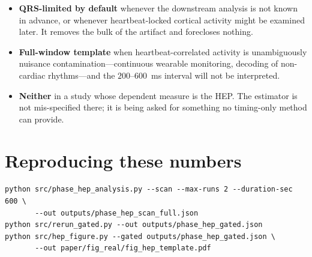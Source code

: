 \documentclass[11pt]{article}
\begin{document}
\begin{itemize}[leftmargin=1.4em,itemsep=0.2em]
\item \textbf{QRS-limited by default} whenever the downstream analysis is not known in advance, or
whenever heartbeat-locked cortical activity might be examined later. It removes the bulk of the
artifact and forecloses nothing.
\item \textbf{Full-window template} when heartbeat-correlated activity is unambiguously nuisance
contamination---continuous wearable monitoring, decoding of non-cardiac rhythms---and the
$200$--$600$~ms interval will not be interpreted.
\item \textbf{Neither} in a study whose dependent measure is the HEP. The estimator is not
mis-specified there; it is being asked for something no timing-only method can provide.
\end{itemize}

\section*{Reproducing these numbers}

\begin{verbatim}
python src/phase_hep_analysis.py --scan --max-runs 2 --duration-sec 600 \
       --out outputs/phase_hep_scan_full.json
python src/rerun_gated.py --out outputs/phase_hep_gated.json
python src/hep_figure.py --gated outputs/phase_hep_gated.json \
       --out paper/fig_real/fig_hep_template.pdf
\end{verbatim}
\end{document}
